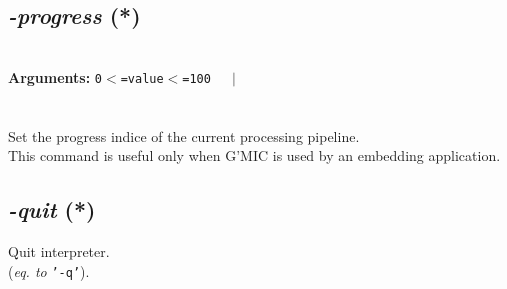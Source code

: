 \documentclass[a4paper,11pt,twoside]{book}
\begin{document}
\subsection{\emph{-progress} (*)}\vspace*{-0.5em}
~\\\textbf{Arguments: } 
{\small \texttt{0$<$=value$<$=100}}~~~$|$\\
\\~\\
Set the progress indice of the current processing pipeline.
~\\This command is useful only when G'MIC is used by an embedding application.


\subsection{\emph{-quit} (*)}\vspace*{-0.5em}
Quit interpreter.
~\\(\emph{eq. to} {\small \texttt{'-q'}}).
\end{document}
